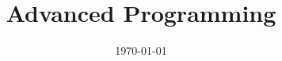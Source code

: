\documentclass[a4paper,12pt]{report}
\institute{UniTs - University of Trieste}
\title{Advanced Programming}
\date{\today}
\begin{document}
\maketitle



\toc


\printbibliography
\end{document}
